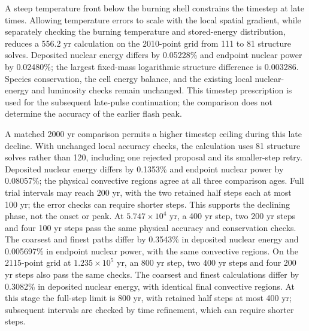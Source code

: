 \documentclass[11pt,letterpaper]{article}
\begin{document}
A steep temperature front below the burning shell constrains the timestep
at late times. Allowing temperature errors to scale with the local spatial
gradient, while separately checking the burning temperature and stored-energy
distribution, reduces a 556.2 yr calculation on the 2010-point grid from
111 to 81 structure solves. Deposited nuclear energy differs by 0.05228\%
and endpoint nuclear power by 0.02480\%; the largest fixed-mass logarithmic
structure difference is 0.003286. Species conservation, the cell energy
balance, and the existing local nuclear-energy and luminosity checks remain
unchanged. This timestep prescription is used for the subsequent late-pulse
continuation; the comparison does not determine the accuracy of the earlier
flash peak.

A matched 2000 yr comparison permits a higher timestep ceiling during this
late decline. With unchanged local accuracy checks, the calculation uses
81 structure solves rather than 120, including one rejected proposal and its
smaller-step retry. Deposited nuclear energy differs by 0.1353\% and endpoint
nuclear power by 0.08057\%; the physical convective regions agree at all three
comparison ages. Full trial intervals may reach 200 yr, with the two retained
half steps each at most 100 yr; the error checks can require shorter steps.
This supports the declining phase, not the onset or peak.
At $5.747\times10^4$ yr, a 400 yr step, two 200 yr steps and four 100 yr
steps pass the same physical accuracy and conservation checks. The coarsest
and finest paths differ by 0.3543\% in deposited nuclear energy and
0.005697\% in endpoint nuclear power, with the same convective regions.
On the 2115-point grid at $1.235\times10^5$ yr, an 800 yr step,
two 400 yr steps and four 200 yr steps also pass the same checks.
The coarsest and finest calculations differ by 0.3082\% in deposited nuclear
energy, with identical final convective regions. At this stage the full-step limit is
800 yr, with retained half steps at most 400 yr; subsequent intervals
are checked by time refinement, which can require shorter steps.
\end{document}
